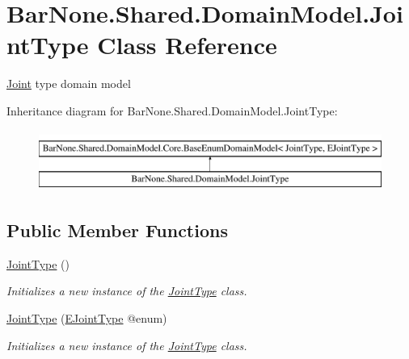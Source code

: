 \hypertarget{class_bar_none_1_1_shared_1_1_domain_model_1_1_joint_type}{}\section{Bar\+None.\+Shared.\+Domain\+Model.\+Joint\+Type Class Reference}
\label{class_bar_none_1_1_shared_1_1_domain_model_1_1_joint_type}


\mbox{\hyperlink{class_bar_none_1_1_shared_1_1_domain_model_1_1_joint}{Joint}} type domain model  


Inheritance diagram for Bar\+None.\+Shared.\+Domain\+Model.\+Joint\+Type\+:\begin{figure}[H]
\begin{center}
\leavevmode
\includegraphics[height=2.000000cm]{class_bar_none_1_1_shared_1_1_domain_model_1_1_joint_type}
\end{center}
\end{figure}
\subsection*{Public Member Functions}
\begin{DoxyCompactItemize}
\item 
\mbox{\hyperlink{class_bar_none_1_1_shared_1_1_domain_model_1_1_joint_type_a32908b92836550221ca3da90b1bc51f0}{Joint\+Type}} ()
\begin{DoxyCompactList}\small\item\em Initializes a new instance of the \mbox{\hyperlink{class_bar_none_1_1_shared_1_1_domain_model_1_1_joint_type}{Joint\+Type}} class. \end{DoxyCompactList}\item 
\mbox{\hyperlink{class_bar_none_1_1_shared_1_1_domain_model_1_1_joint_type_a6a8db8ad6cff9075f9b60edfe992a209}{Joint\+Type}} (\mbox{\hyperlink{namespace_bar_none_1_1_shared_1_1_domain_model_a1aeba40858ef83a78921f013cdabb369}{E\+Joint\+Type}} @enum)
\begin{DoxyCompactList}\small\item\em Initializes a new instance of the \mbox{\hyperlink{class_bar_none_1_1_shared_1_1_domain_model_1_1_joint_type}{Joint\+Type}} class. \end{DoxyCompactList}\end{DoxyCompactItemize}
